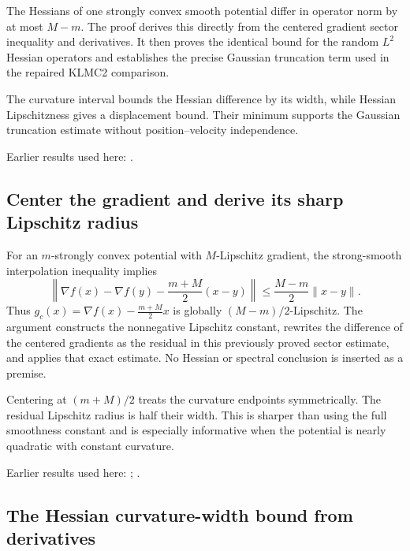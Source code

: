 \documentclass[11pt,a4paper]{report}
\begin{document}
The Hessians of one strongly convex smooth potential differ in operator norm by at most \(M-m\). The proof derives this directly from the centered gradient sector inequality and derivatives. It then proves the identical bound for the random \(L^{2}\) Hessian operators and establishes the precise Gaussian truncation term used in the repaired KLMC2 comparison.



The curvature interval bounds the Hessian difference by its width, while Hessian Lipschitzness gives a displacement bound. Their minimum supports the Gaussian truncation estimate without position–velocity independence.



Earlier results used here: \cite[Section~3.10]{LangevinLean2026ULASC}.
\subsection{\texorpdfstring{Center the gradient and derive its sharp Lipschitz radius}{Center the gradient and derive its sharp Lipschitz radius}}
\label{report-step-KineticLangevin-HessianDifference-lean-1}


For an \(m\)-strongly convex potential with \(M\)-Lipschitz gradient, the strong-smooth interpolation inequality implies \[\left\|\nabla f(x)-\nabla f(y)-\frac{m+M}{2}(x-y)\right\|\le\frac{M-m}{2}\|x-y\|.\] Thus \(g_c(x)=\nabla f(x)-\frac{m+M}{2}x\) is globally \((M-m)/2\)-Lipschitz. The argument constructs the nonnegative Lipschitz constant, rewrites the difference of the centered gradients as the residual in this previously proved sector estimate, and applies that exact estimate. No Hessian or spectral conclusion is inserted as a premise.



Centering at \((m+M)/2\) treats the curvature endpoints symmetrically. The residual Lipschitz radius is half their width. This is sharper than using the full smoothness constant and is especially informative when the potential is nearly quadratic with constant curvature.



Earlier results used here: \cite[Section~3.10.2]{LangevinLean2026ULASC}; \cite[Section~3.10.3]{LangevinLean2026ULASC}.
\subsection{\texorpdfstring{The Hessian curvature-width bound from derivatives}{The Hessian curvature-width bound from derivatives}}
\label{report-step-KineticLangevin-HessianDifference-lean-2}
\end{document}
